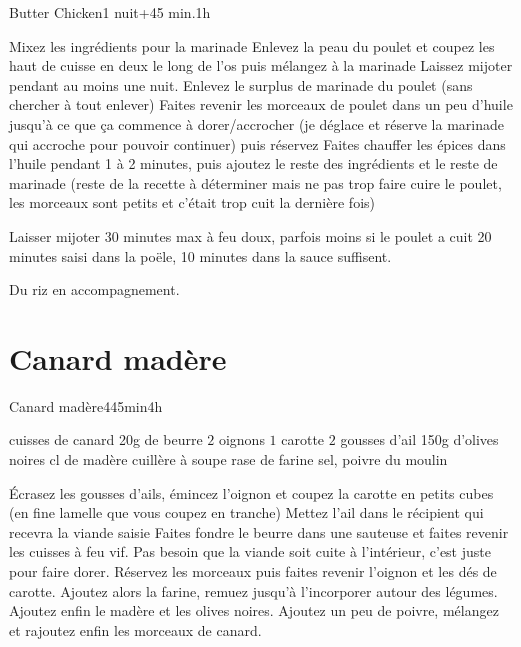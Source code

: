 {\begin{recette}{Butter Chicken}{}{1 nuit+45 min.}{1h}
\begin{preparation}
\etape Mixez les ingrédients pour la marinade
\etape Enlevez la peau du poulet et coupez les haut de cuisse en deux le long de l'os puis mélangez à la marinade
\etape Laissez mijoter pendant au moins une nuit.
\etape Enlevez le surplus de marinade du poulet (sans chercher à tout enlever)
\etape Faites revenir les morceaux de poulet dans un peu d'huile jusqu'à ce que ça commence à dorer/accrocher (je déglace et réserve la marinade qui accroche pour pouvoir continuer) puis réservez
\etape Faites chauffer les épices dans l'huile pendant 1 à 2 minutes, puis ajoutez le reste des ingrédients et le reste de marinade
\etape (reste de la recette à déterminer mais ne pas trop faire cuire le poulet, les morceaux sont petits et c'était trop cuit la dernière fois)
\end{preparation}

\begin{cuisson}
Laisser mijoter 30 minutes max à feu doux, parfois moins si le poulet a cuit 20 minutes saisi dans la poële, 10 minutes dans la sauce suffisent. 

Du riz en accompagnement.
\end{cuisson}
\end{recette}

\section{Canard madère}
\begin{recette}{Canard madère}{4}{45min}{4h}

\begin{ingredients}
 cuisses de canard
\ingredient 20g de beurre
\ingredient $2$ oignons
\ingredient $1$ carotte
\ingredient $2$ gousses d'ail
\ingredient 150g d'olives noires
 cl de madère
 cuillère à soupe rase de farine
\ingredient sel, poivre du moulin
\end{ingredients}

\begin{preparation}
\etape Écrasez les gousses d'ails, émincez l'oignon et coupez la carotte en petits cubes (en fine lamelle que vous coupez en 
tranche)
\etape Mettez l'ail dans le récipient qui recevra la viande saisie
\etape Faites fondre le beurre dans une sauteuse et faites revenir les cuisses à feu vif. Pas besoin que la viande soit cuite à l'intérieur, c'est juste pour faire dorer.
\etape Réservez les morceaux puis faites revenir l'oignon et les dés de carotte.
\etape Ajoutez alors la farine, remuez jusqu'à l'incorporer autour des légumes. Ajoutez enfin le madère et les olives noires. Ajoutez un peu de poivre, mélangez et rajoutez enfin les morceaux de canard.
\end{preparation}


\end{recette}}
